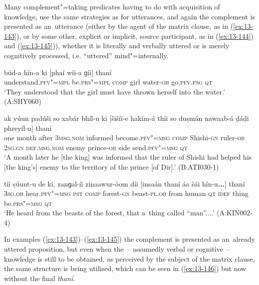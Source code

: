  Many complement"=taking predicates having to do with acquisition of knowledge, use the same strategies as for utterances, and again the complement is presented as an~utterance (either by the agent of the matrix clause, as in (\ref{ex:13-143}), or by some other, explicit or implicit, source participant, as in (\ref{ex:13-144}) and (\ref{ex:13-145})), whether it is literally and verbally uttered or is merely cognitively processed, i.e. ``uttered'' mind"=internally. 

\begin{exe}
\ex
\label{ex:13-143}
\gll \label{bkm:Ref190835538}búd-a hín-a ki [phaí wíi-a  ɡíi] thaní \\
understand.\textsc{pfv"=mpl} be.\textsc{prs"=mpl} \textsc{comp} girl water-\textsc{ob} go.\textsc{pfv.fsg} \textsc{qt} \\
\glt `They understood that the girl must have thrown herself into the water.' (A:SHY060)

\ex
\label{ex:13-144}
\gll ak yúun padúši so xabár bhíl-u  ki [šišíi-e hakim-á thíi so
  duṣmán nawaab-á  ḍáḍi phreyíl-u] thaní \\
one month after \textsc{3msg.nom} informed become.\textsc{pfv"=msg}  \textsc{comp} Shishi-\textsc{gn} ruler-\textsc{ob } \textsc{2sg.gn} \textsc{def.msg.nom} enemy prince-\textsc{ob} side send.\textsc{pfv"=msg} \textsc{qt}  \\
\glt `A month later he [the king] was informed that the ruler of Shishi had helped his [the king's] enemy to the territory of the prince [of Dir].' (B:ATI030-1)

\ex
\label{ex:13-145}
\gll \label{bkm:Ref190835565}tíi ṣúunt-u de ki, zanɡal-íi zinaawur-óom  díi [insaán thaní áa šái hín-u\textbf{...}] thaní \\
\textsc{3sg.ob} hear.\textsc{pfv"=msg} \textsc{pst} \textsc{comp} forest-\textsc{gn} beast-\textsc{pl.ob}  from human \textsc{qt} \textsc{idef} thing be.\textsc{prs"=msg} \textsc{qt} \\
\glt `He heard from the beasts of the forest, that a~thing called ``man''....' (A:KIN002-4) 
\end{exe}

In examples (\ref{ex:13-143})--(\ref{ex:13-145}) the complement is presented as an~already uttered proposition, but even when the~-- assumedly verbal or cognitive~-- knowledge is still to be obtained, as perceived by the subject of the matrix clause, the same structure is being utilised, which can be seen in (\ref{ex:13-146}) but now without the final \textit{thaní}. 

